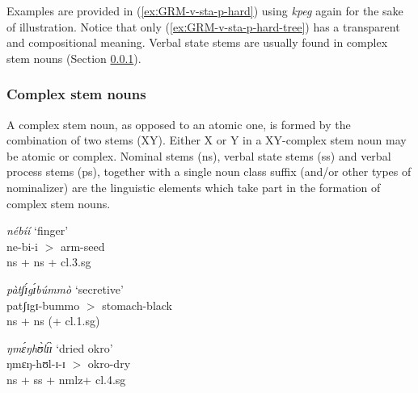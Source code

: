 \begin{exe}
\begin{exe}
\begin{exe}
{\begin{exe}
\begin{exe}
\begin{exe}
\begin{exe}
 Examples  are provided in
(\ref{exːGRM-v-sta-p-hard}) using  {\it kpeg} again for
the sake of illustration.  Notice that only (\ref{exːGRM-v-sta-p-hard-tree}) has
a transparent and compositional meaning. Verbal state stems are 
usually found in complex stem nouns (Section \ref{sec:GRM-com-stem-noun}). 










 


\subsubsection{Complex stem nouns}
\label{sec:GRM-com-stem-noun}


A  complex stem noun, as opposed to an atomic one,  is formed by the
combination of two stems (XY). Either X or Y in a  XY-complex stem noun may be 
atomic or complex.  Nominal stems ({\sc ns}), verbal state stems ({\sc ss}) and
verbal process stems ({\sc ps}), together with a single noun class  suffix 
(and/or other
types of nominalizer) are
the linguistic elements which take part in the
formation of complex stem nouns. 


\ea\label{exːGRM-cplx-stm}
 

  \ea\label{exːGRM-cplx-stm-NS-NS-1}%
{\it nébíí} {\rm  `finger'}\\  %
ne-bi-i  $>$  {\sc arm-seed} \\%
 {\sc ns} + {\sc ns} + {\sc cl.3.sg}
 

  \ex\label{exːGRM-cplx-stm-NS-NS-2}
 {\it pàtʃɪ́gɪ́búmmò} {\rm  `secretive'}\\ %
patʃɪgɪ-bummo  $>$  {\sc stomach-black}  \\  %
 {\sc ns} + {\sc ns} (+ {\sc cl.1.sg})

 \ex\label{exːGRM-cplx-stm-NS-SS}
 {\it ŋmɛ́ŋhʊ̀lɪ́ɪ̀} {\rm   `dried okro'} \\ %
ŋmɛŋ-hʊl-ɪ-ɪ $>$   {\sc okro-dry}  \\  %
 {\sc ns} + {\sc ss} + {\sc nmlz}+ {\sc cl.4.sg}
 

\end{exe}
\end{exe}
\end{exe}
\end{exe}}
\end{exe}
\end{exe}
\end{exe}
